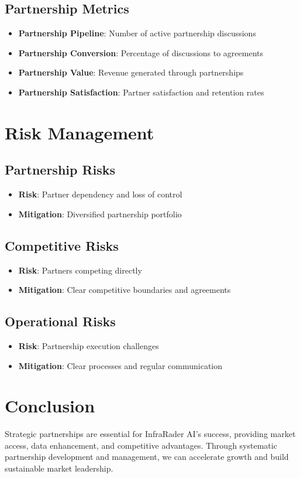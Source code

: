 \documentclass[business]{../templates/infraradar-main}
\begin{document}
\subsection{Partnership Metrics}
\begin{itemize}
    \item \textbf{Partnership Pipeline}: Number of active partnership discussions
    \item \textbf{Partnership Conversion}: Percentage of discussions to agreements
    \item \textbf{Partnership Value}: Revenue generated through partnerships
    \item \textbf{Partnership Satisfaction}: Partner satisfaction and retention rates
\end{itemize}

\section{Risk Management}

\subsection{Partnership Risks}
\begin{itemize}
    \item \textbf{Risk}: Partner dependency and loss of control
    \item \textbf{Mitigation}: Diversified partnership portfolio
\end{itemize}

\subsection{Competitive Risks}
\begin{itemize}
    \item \textbf{Risk}: Partners competing directly
    \item \textbf{Mitigation}: Clear competitive boundaries and agreements
\end{itemize}

\subsection{Operational Risks}
\begin{itemize}
    \item \textbf{Risk}: Partnership execution challenges
    \item \textbf{Mitigation}: Clear processes and regular communication
\end{itemize}

\section{Conclusion}

Strategic partnerships are essential for InfraRader AI's success, providing market access, data enhancement, and competitive advantages. Through systematic partnership development and management, we can accelerate growth and build sustainable market leadership.
\end{document}
